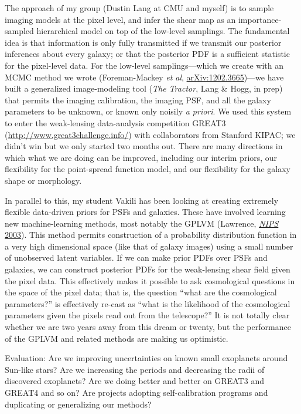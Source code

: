 \documentclass[11pt, letterpaper]{article}
\newcommand{\arxiv}[1]{\href{http://arxiv.org/abs/#1}{arXiv:#1}}
\begin{document}
The approach of my group (Dustin Lang at CMU and myself) is to sample
imaging models at the pixel level, and infer the shear map as an
importance-sampled hierarchical model on top of the low-level
samplings.
The fundamental idea is that information is only fully transmitted if
we transmit our posterior inferences about every galaxy; or that the
posterior PDF is a sufficient statistic for the pixel-level data.
For the low-level samplings---which we create with an MCMC method we
wrote (Foreman-Mackey \textit{et al}, \arxiv{1202.3665})---we have
built a generalized image-modeling tool (\textsl{The Tractor}, Lang \&
Hogg, in prep) that permits the imaging calibration, the imaging PSF,
and all the galaxy parameters to be unknown, or known only noisily
\textit{a priori}.
We used this system to enter the weak-lensing data-analysis
competition GREAT3 (\url{http://www.great3challenge.info/})
with collaborators from Stanford KIPAC;
we didn't win but we only started two months out.
There are many directions in which what we are doing can be improved,
including our interim priors, our flexibility for the point-spread
function model, and our flexibility for the galaxy shape or
morphology.

In parallel to this, my student Vakili has been looking at creating
extremely flexible data-driven priors for PSFs and galaxies.
These have involved learning new machine-learning methods,
most notably the GPLVM
(Lawrence, \href{http://papers.nips.cc/paper/2540-gaussian-process-latent-variable-models-for-visualisation-of-high-dimensional-data.pdf}{\textit{NIPS} 2003}).
This method permits construction of a probability distribution
function in a very high dimensional space (like that of galaxy images)
using a small number of unobserved latent variables.
If we can make prior PDFs over PSFs and galaxies, we can construct
posterior PDFs for the weak-lensing shear field given the pixel data.
This effectively makes it possible to ask cosmological questions in
the space of the pixel data; that is, the question ``what are the
cosmological parameters?'' is effectively re-cast as ``what is the
likelihood of the cosmological parameters given the pixels read out
from the telescope?''
It is not totally clear whether we are two years away from this dream
or twenty, but the performance of the GPLVM and related methods are
making us optimistic.

Evaluation: Are we improving uncertainties on known small exoplanets
around Sun-like stars?  Are we increasing the periods and decreasing
the radii of discovered exoplanets?  Are we doing better and better on
GREAT3 and GREAT4 and so on?  Are projects adopting self-calibration
programs and duplicating or generalizing our methods?
\end{document}
